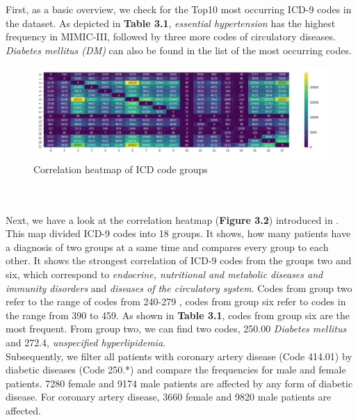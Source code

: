\documentclass[11pt, a4paper, oneside]{book}
\begin{document}
First, as a basic overview, we check for the Top10 most occurring ICD-9 codes in the dataset. As depicted in \textbf{Table 3.1}, \textit{essential hypertension} has the highest frequency in MIMIC-III, followed by three more codes of circulatory diseases. \textit{Diabetes mellitus (DM)} can also be found in the list of the most occurring codes.

\begin{figure}
  \begin{center}
  \includegraphics[width=1\textwidth]{img/correlation-heatmap.png}
  \caption{Correlation heatmap of ICD code groups \citep{arya2019exploratory}}
  \label{fig:correlation-heatmap}
  \end{center}
\end{figure}


\\
\\
Next, we have a look at the correlation heatmap (\textbf{Figure 3.2}) introduced in \citep{arya2019exploratory}. This map divided ICD-9 codes into 18 groups. It shows, how many patients have a diagnosis of two groups at a same time and compares every group to each other. It shows the strongest correlation of ICD-9 codes from the groups two and six, which correspond to \textit{endocrine, nutritional and metabolic diseases and immunity disorders} and \textit{diseases of the circulatory system}. Codes from group two refer to the range of codes from 240-279 , codes from group six refer to codes in the range from 390 to 459. As shown in \textbf{Table 3.1}, codes from group six are the most frequent. From group two, we can find two codes, 250.00 \textit{Diabetes mellitus} and 272.4, \textit{unspecified hyperlipidemia}.
\\

Subsequently, we filter all patients with coronary artery disease (Code 414.01) by diabetic diseases (Code 250.*) and compare the frequencies for male and female patients. 7280 female and 9174 male patients are affected by any form of diabetic disease.
For coronary artery disease, 3660 female and 9820 male patients are affected. 
\end{document}
